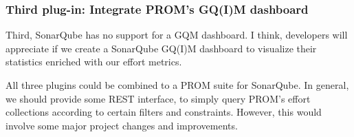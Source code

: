\subsubsection{Third plug-in: Integrate PROM's GQ(I)M dashboard}

Third, SonarQube has no support for a GQM dashboard. I think, developers will
appreciate if we create a SonarQube GQ(I)M dashboard to visualize their
statistics enriched with our effort metrics. 

All three plugins could be combined to a PROM suite for SonarQube. In general,
we should provide some REST interface, to simply query PROM's effort collections
according to certain filters and constraints. However, this would involve some
major project changes and improvements.
